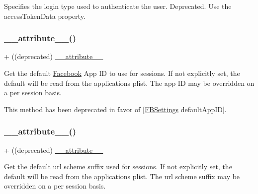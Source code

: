Specifies the login type used to authenticate the user.  Deprecated. Use the {\ttfamily access\+Token\+Data} property. \mbox{\label{interfaceFBSession_aab7b90337909b905920a4067b5253c2b}} 
\subsubsection{\texorpdfstring{\+\_\+\+\_\+attribute\+\_\+\+\_\+()}{\_\_attribute\_\_()}\hspace{0.1cm}{\footnotesize\ttfamily [16/25]}}
{\footnotesize\ttfamily + ((deprecated) \hyperlink{struct____attribute____}{\+\_\+\+\_\+attribute\+\_\+\+\_\+} \begin{DoxyParamCaption}{ }\end{DoxyParamCaption}}

Get the default \hyperlink{interfaceFacebook}{Facebook} App ID to use for sessions. If not explicitly set, the default will be read from the application\textquotesingle{}s plist. The app ID may be overridden on a per session basis.

This method has been deprecated in favor of \mbox{[}\hyperlink{interfaceFBSettings}{F\+B\+Settings} default\+App\+ID\mbox{]}. \mbox{\label{interfaceFBSession_aab7b90337909b905920a4067b5253c2b}} 
\subsubsection{\texorpdfstring{\+\_\+\+\_\+attribute\+\_\+\+\_\+()}{\_\_attribute\_\_()}\hspace{0.1cm}{\footnotesize\ttfamily [17/25]}}
{\footnotesize\ttfamily + ((deprecated) \hyperlink{struct____attribute____}{\+\_\+\+\_\+attribute\+\_\+\+\_\+} \begin{DoxyParamCaption}{ }\end{DoxyParamCaption}}

Get the default url scheme suffix used for sessions. If not explicitly set, the default will be read from the application\textquotesingle{}s plist. The url scheme suffix may be overridden on a per session basis.

